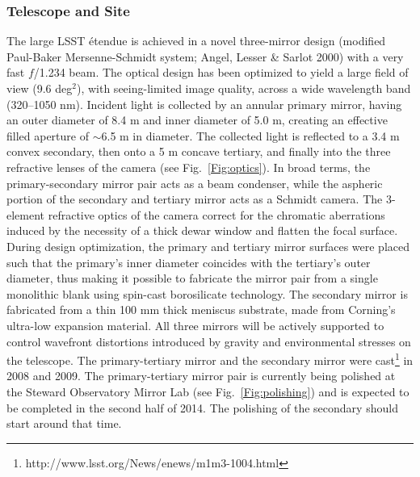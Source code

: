\documentclass{emulateapj}
\begin{document}
\subsubsection{ Telescope and Site}

The large LSST \'etendue is achieved in a novel three-mirror design (modified
Paul-Baker Mersenne-Schmidt system; Angel, Lesser \& Sarlot 2000) with a very fast $f$/1.234 beam. The optical 
design has been optimized to yield a large field of view (9.6 deg$^2$), 
with seeing-limited image quality, across a wide wavelength band (320--1050
nm). Incident light is collected by an annular primary mirror, having
an outer diameter of 8.4 m and inner diameter of 5.0 m, creating an effective filled aperture of 
$\sim$6.5 m in diameter. The collected light is reflected to a 3.4 m convex secondary, then onto
a 5 m concave tertiary, and finally  into the three refractive lenses of the camera (see Fig.~\ref{Fig:optics}).  
In broad terms, the primary-secondary mirror pair acts as a beam condenser, while the aspheric portion of 
the secondary and tertiary mirror acts as a Schmidt camera.  The 3-element refractive optics of the camera
correct for the chromatic aberrations induced by the necessity of a thick dewar window and flatten the
focal surface.  During design optimization, the primary and tertiary mirror surfaces were placed such that the primary's 
inner diameter coincides with the tertiary's outer diameter, thus making it possible to fabricate the mirror pair from a 
single monolithic blank using spin-cast borosilicate technology. The secondary mirror is fabricated from 
a thin 100 mm thick meniscus substrate, made from Corning's ultra-low expansion material. All 
three mirrors will be actively supported to control wavefront distortions 
introduced by gravity and environmental stresses on the telescope. 
The primary-tertiary mirror and the secondary mirror were 
cast\footnote{http://www.lsst.org/News/enews/m1m3-1004.html}  in 2008
and 2009.  The primary-tertiary mirror pair is currently being polished at the Steward Observatory Mirror Lab
(see Fig.~\ref{Fig:polishing}) and is expected to be completed in the second half of 2014.  The polishing of
the secondary should start around that time.  
\end{document}

